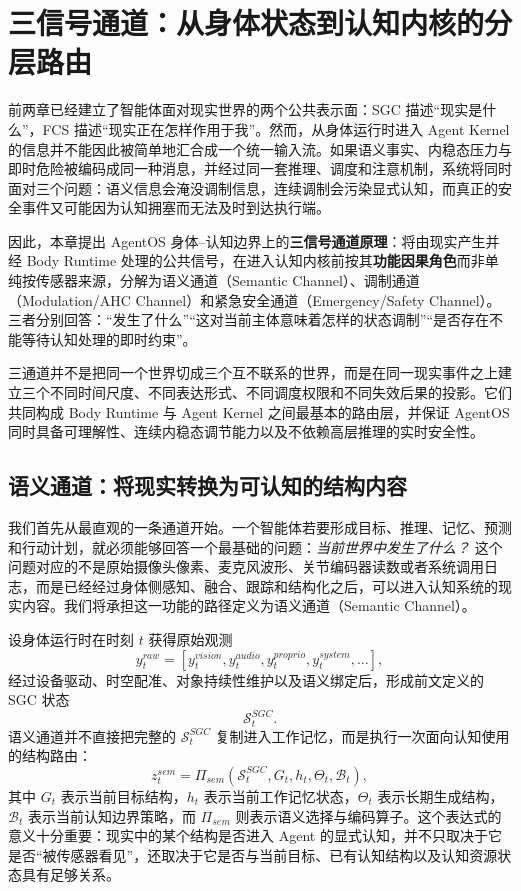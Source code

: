 \chapter{三信号通道：从身体状态到认知内核的分层路由}
\label{chap:three-signal-channels}

\begin{chapterlead}
前两章已经建立了智能体面对现实世界的两个公共表示面：SGC 描述“现实是什么”，FCS 描述“现实正在怎样作用于我”。然而，从身体运行时进入 Agent Kernel 的信息并不能因此被简单地汇合成一个统一输入流。如果语义事实、内稳态压力与即时危险被编码成同一种消息，并经过同一套推理、调度和注意机制，系统将同时面对三个问题：语义信息会淹没调制信息，连续调制会污染显式认知，而真正的安全事件又可能因为认知拥塞而无法及时到达执行端。

因此，本章提出 AgentOS 身体--认知边界上的\textbf{三信号通道原理}：将由现实产生并经 Body Runtime 处理的公共信号，在进入认知内核前按其\textbf{功能因果角色}而非单纯按传感器来源，分解为语义通道（Semantic Channel）、调制通道（Modulation/AHC Channel）和紧急安全通道（Emergency/Safety Channel）。三者分别回答：“发生了什么”“这对当前主体意味着怎样的状态调制”“是否存在不能等待认知处理的即时约束”。

三通道并不是把同一个世界切成三个互不联系的世界，而是在同一现实事件之上建立三个不同时间尺度、不同表达形式、不同调度权限和不同失效后果的投影。它们共同构成 Body Runtime 与 Agent Kernel 之间最基本的路由层，并保证 AgentOS 同时具备可理解性、连续内稳态调节能力以及不依赖高层推理的实时安全性。
\end{chapterlead}


\section{语义通道：将现实转换为可认知的结构内容}
\label{sec:semantic-channel}

我们首先从最直观的一条通道开始。一个智能体若要形成目标、推理、记忆、预测和行动计划，就必须能够回答一个最基础的问题：\emph{当前世界中发生了什么？} 这个问题对应的不是原始摄像头像素、麦克风波形、关节编码器读数或者系统调用日志，而是已经经过身体侧感知、融合、跟踪和结构化之后，可以进入认知系统的现实内容。我们将承担这一功能的路径定义为语义通道（Semantic Channel）。

设身体运行时在时刻 $t$ 获得原始观测
\[
y_t^{raw}
=
\left[
y_t^{vision},
y_t^{audio},
y_t^{proprio},
y_t^{system},
\ldots
\right],
\]
经过设备驱动、时空配准、对象持续性维护以及语义绑定后，形成前文定义的 SGC 状态
\[
\mathcal{S}_t^{SGC}.
\]
语义通道并不直接把完整的 $\mathcal{S}_t^{SGC}$ 复制进入工作记忆，而是执行一次面向认知使用的结构路由：
\[
z_t^{sem}
=
\Pi_{sem}
\left(
\mathcal{S}_t^{SGC},
G_t,
h_t,
\Theta_t,
\mathcal{B}_t
\right),
\]
其中 $G_t$ 表示当前目标结构，$h_t$ 表示当前工作记忆状态，$\Theta_t$ 表示长期生成结构，$\mathcal{B}_t$ 表示当前认知边界策略，而 $\Pi_{sem}$ 则表示语义选择与编码算子。这个表达式的意义十分重要：现实中的某个结构是否进入 Agent 的显式认知，并不只取决于它是否“被传感器看见”，还取决于它是否与当前目标、已有认知结构以及认知资源状态具有足够关系。


